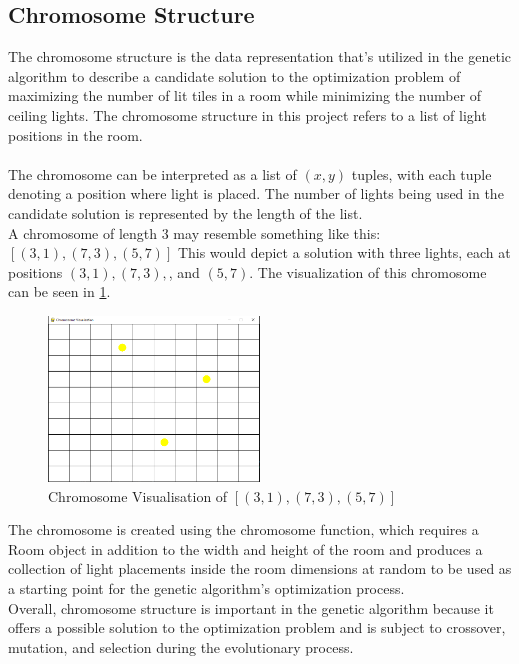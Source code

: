 \documentclass[conference]{IEEEtran}
\begin{document}
\subsection{Chromosome Structure}
The chromosome structure is the data representation that's utilized in the genetic algorithm to describe a candidate solution to the optimization problem of maximizing the number of lit tiles in a room while minimizing the number of ceiling lights. The chromosome structure in this project refers to a list of light positions in the room.\\
\\
The chromosome can be interpreted as a list of $(x,y)$ tuples, with each tuple denoting a position where light is placed. The number of lights being used in the candidate solution is represented by the length of the list.
\\
A chromosome of length 3 may resemble something like this: $[(3, 1), (7, 3), (5, 7)]$
This would depict a solution with three lights, each at positions $(3,1), (7,3),$, and $(5,7).$ The visualization of this chromosome can be seen in \ref{chromosone}.\\
\begin{figure}
    \caption{Chromosome Visualisation of $[(3, 1), (7, 3), (5, 7)]$}
    \centerline{\includegraphics[width=0.5\textwidth]{chromosone.PNG}}
    \label{chromosone}
\end{figure}

The chromosome is created using the chromosome function, which requires a Room object in addition to the width and height of the room and produces a collection of light placements inside the room dimensions at random to be used as a starting point for the genetic algorithm's optimization process.
\\
Overall, chromosome structure is important in the genetic algorithm because it offers a possible solution to the optimization problem and is subject to crossover, mutation, and selection during the evolutionary process.
\end{document}
